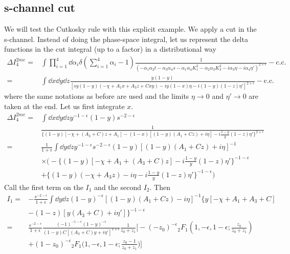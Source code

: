 \subsection{s-channel cut}
We will test the Cutkosky rule with this explicit example. 
We apply a cut in the s-channel.
Instead of doing the phase-space integral, let us represent the delta functions in the cut integral (up to a factor) in a distributional way
\begin{equation*}
\begin{split}
\Delta I_{4}^{2m e} = &
\int\prod_{i=1}^4 \dd \alpha_i \delta(\sum_{i=1}^4\alpha_i - 1)
\frac{1}{(-\alpha_1\alpha_2 t -\alpha_3\alpha_4 s- \alpha_1\alpha_4 K_1^2 - \alpha_2\alpha_3 K_3^2 - i\alpha_3\eta - i\alpha_4\eta')^{2+\epsilon}} 
- \mathrm{c.c.}
\\
 = &
\int\dd x \dd y \dd z
\frac{y(1-y)}{[sy(1-y)(-\chi + A_1x + A_3 z + Cxy) - iy(1-x)\eta - i(1-y)(1-z)\eta']^{2+\epsilon}} -\mathrm{c.c.}
\end{split}
\end{equation*}
where the same notations as before are used and the limits $\eta\rightarrow 0$ and $\eta'\rightarrow 0$ are taken at the end.
Let us first integrate \wrt $x$.
\begin{equation*}
\begin{split}
\Delta I_4^{2me} = &
\int\dd x \dd y \dd z y^{-1-\epsilon}(1-y)s^{-2-\epsilon}
\\
&
\frac{1}{\big\{(1-y)[-\chi + (A_3+C)z + A_1] - (1-x)[(1-y)(A_1 + Cz)  +i\eta]-i\frac{1-y}{y}(1-z)\eta'\big\}^{2+\epsilon}}
\\
= &
\frac{1}{1+\epsilon}
\int\dd y \dd z y^{-1-\epsilon}s^{-2-\epsilon}(1-y)[(1-y)(A_1 + Cz ) +i\eta]^{-1}
\\
& \times
\Big(-\{(1-y)[-\chi + A_1 + (A_3 + C)z ] - i\frac{1-y}{y}(1-z)\eta'\}^{-1-\epsilon} 
\\
&
+\{(1-y)(-\chi + A_3z) - i\eta - i\frac{1-y}{y}(1-z)\eta'\}^{-1-\epsilon}\Big)
\end{split}
\end{equation*}
Call the first term on the \rhs $I_1$ and the second $I_2$. Then
\begin{equation*}
\begin{split}
I_1 = &
-\frac{s^{-2-\epsilon}}{1+\epsilon}\int\dd y \dd z (1-y)^{-\epsilon}[(1-y)(A_1 + Cz) - i\eta]^{-1}
\{y[-\chi + A_1 + A_3 + C ] 
\\
& - (1-z)[y(A_3 + C) + i\eta']\}^{-1-\epsilon}
\\
= &
\frac{s^{-2-\epsilon}}{1+\epsilon}\frac{(-1)^{-1-\epsilon}(1-y)^{-\epsilon}}{(1-y )C[(A_3+C)y + i\eta']^{1+\epsilon}}
\frac{1}{z_0 + z_1}\Big[-(-z_0)^{-\epsilon}{}_2F_1(1,-\epsilon, 1-\epsilon; \frac{z_0}{z_0 + z_1})
\\
& + (1-z_0)^{-\epsilon}{}_2F_1\big(1,-\epsilon, 1-\epsilon; \frac{z_0 -1 }{z_0+z_1}\big)\Big]
\end{split}
\end{equation*}
